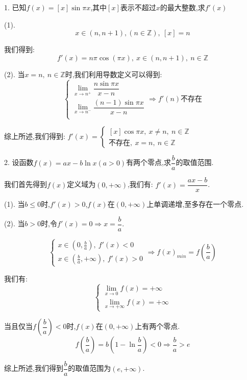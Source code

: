 1. 已知$f(x)=[x]\sin \pi x$,其中$[x]$表示不超过$x$的最大整数,求$f'(x)$
\begin{solution}

	(1). 
	$$x\in(n,n+1),(n\in\mathbb{Z}),\ [x]=n$$
	
	我们得到:  $$f'(x)=n\pi\cos(\pi x),\ x\in(n,n+1), \ n\in\mathbb{Z}$$
	
	(2). 当$x=n,\ n\in\mathbb{Z}$时,我们利用导数定义可以得到:  
	$$\left\lbrace
	\begin{array}{l}
		\lim\limits_{x\to n^{+}}\dfrac{n\sin \pi x}{x-n}\\
		\lim\limits_{x\to n^{-}}\dfrac{(n-1)\sin \pi x}{x-n}\\
	\end{array}
	\right.\Rightarrow f'(n)\text{不存在}$$
	
	综上所述,我们得到:  $f'(x)=\left\lbrace
	\begin{array}{l}
		[x]\cos \pi x,\ x\neq n,\ n\in\mathbb{Z}\\
		\text{不存在},\ x=n,\ n\in\mathbb{Z}
	\end{array}
	\right. $
\end{solution}

2. 设函数$f(x)=ax-b\ln x(a>0)$有两个零点,求$\dfrac{b}{a}$的取值范围.
\begin{solution}

	我们首先得到$f(x)$定义域为$(0,+\infty)$,我们有:  $f'(x)=\dfrac{ax-b}{x}$.
	
	(1). 当$b\leq 0$时,$f'(x)>0$,$f(x)$在$(0,+\infty)$上单调递增,至多存在一个零点.
	
	(2). 当$b>0$时,令$f'(x)=0\Rightarrow x=\dfrac{b}{a}$.
	
	$$\left\lbrace
	\begin{array}{l}
		x\in(0,\frac{b}{a}),\ f'(x)<0\\
		x\in(\frac{b}{a},+\infty),\ f'(x)>0
	\end{array}
	\right. \Rightarrow f(x)_{min}=f(\dfrac{b}{a})$$
	
	我们有:  $$\left\lbrace
	\begin{array}{l}
		\lim\limits_{x\to 0}f(x)=+\infty\\
		\lim\limits_{x\to +\infty}f(x)=+\infty
	\end{array}
	\right. $$
	
	当且仅当$f(\dfrac{b}{a})<0$时,$f(x)$在$(0,+\infty)$上有两个零点.
	$$f(\dfrac{b}{a})=b(1-\ln\dfrac{b}{a})<0\Rightarrow \dfrac{b}{a}>e$$
	
	综上所述,我们得到$\dfrac{b}{a}$的取值范围为$(e,+\infty)$.
\end{solution}

